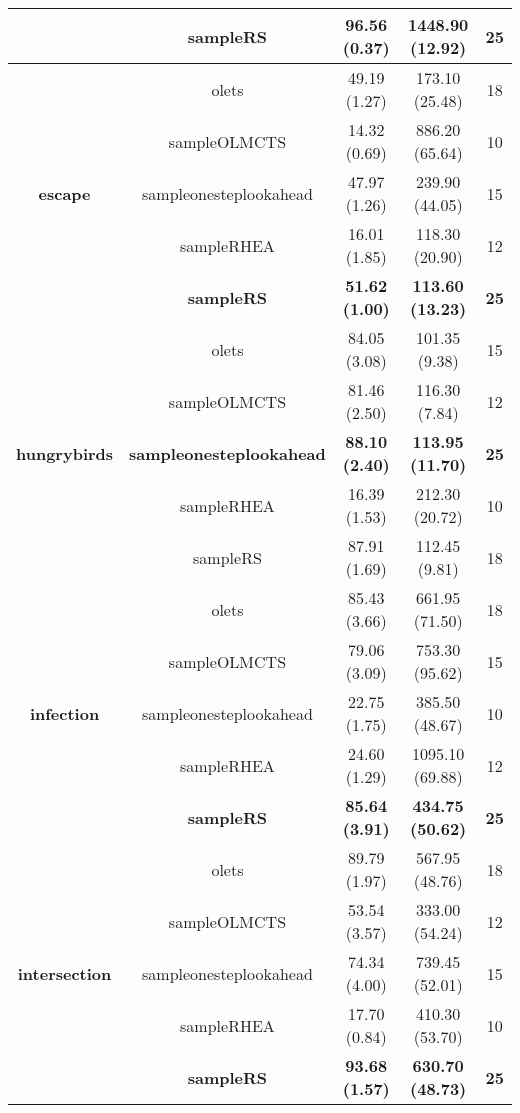 \begin{table*}[!t]
\begin{center}
\begin{adjustbox}{width=1\textwidth}
\begin{tabular}{|c|c|c|c|c|}
 \\
\cline{2-5}
 & \textbf{sampleRS} & \textbf{96.56 (0.37)} & \textbf{1448.90 (12.92)} & \textbf{25}
 \\
\hline
\hline
\cline{2-5}
\multirow{5}{*}{\textbf{escape}} & olets & 49.19 (1.27) & 173.10 (25.48) & 18
 \\
\cline{2-5}
 & sampleOLMCTS & 14.32 (0.69) & 886.20 (65.64) & 10
 \\
\cline{2-5}
 & sampleonesteplookahead & 47.97 (1.26) & 239.90 (44.05) & 15
 \\
\cline{2-5}
 & sampleRHEA & 16.01 (1.85) & 118.30 (20.90) & 12
 \\
\cline{2-5}
 & \textbf{sampleRS} & \textbf{51.62 (1.00)} & \textbf{113.60 (13.23)} & \textbf{25}
 \\
\hline
\hline
\cline{2-5}
\multirow{5}{*}{\textbf{hungrybirds}} & olets & 84.05 (3.08) & 101.35 (9.38) & 15
 \\
\cline{2-5}
 & sampleOLMCTS & 81.46 (2.50) & 116.30 (7.84) & 12
 \\
\cline{2-5}
 & \textbf{sampleonesteplookahead} & \textbf{88.10 (2.40)} & \textbf{113.95 (11.70)} & \textbf{25}
 \\
\cline{2-5}
 & sampleRHEA & 16.39 (1.53) & 212.30 (20.72) & 10
 \\
\cline{2-5}
 & sampleRS & 87.91 (1.69) & 112.45 (9.81) & 18
 \\
\hline
\hline
\cline{2-5}
\multirow{5}{*}{\textbf{infection}} & olets & 85.43 (3.66) & 661.95 (71.50) & 18
 \\
\cline{2-5}
 & sampleOLMCTS & 79.06 (3.09) & 753.30 (95.62) & 15
 \\
\cline{2-5}
 & sampleonesteplookahead & 22.75 (1.75) & 385.50 (48.67) & 10
 \\
\cline{2-5}
 & sampleRHEA & 24.60 (1.29) & 1095.10 (69.88) & 12
 \\
\cline{2-5}
 & \textbf{sampleRS} & \textbf{85.64 (3.91)} & \textbf{434.75 (50.62)} & \textbf{25}
 \\
\hline
\hline
\cline{2-5}
\multirow{5}{*}{\textbf{intersection}} & olets & 89.79 (1.97) & 567.95 (48.76) & 18
 \\
\cline{2-5}
 & sampleOLMCTS & 53.54 (3.57) & 333.00 (54.24) & 12
 \\
\cline{2-5}
 & sampleonesteplookahead & 74.34 (4.00) & 739.45 (52.01) & 15
 \\
\cline{2-5}
 & sampleRHEA & 17.70 (0.84) & 410.30 (53.70) & 10
 \\
\cline{2-5}
 & \textbf{sampleRS} & \textbf{93.68 (1.57)} & \textbf{630.70 (48.73)} & \textbf{25}

\end{tabular}
\end{adjustbox}
\end{center}
\end{table*}
